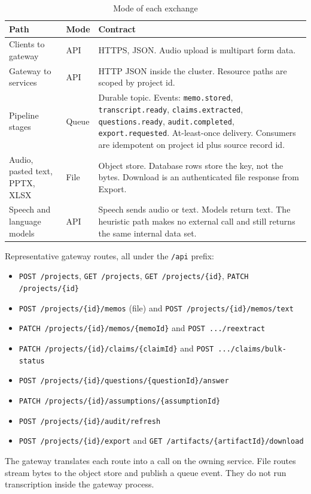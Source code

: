 \documentclass[11pt,a4paper]{article}
\begin{document}
\begin{table}[ht]
\centering
\caption{Mode of each exchange}
\label{tab:modes}
\small
\begin{tabularx}{\textwidth}{@{}l l X@{}}
\toprule
\textbf{Path} & \textbf{Mode} & \textbf{Contract} \\
\midrule
Clients to gateway &
API &
HTTPS, JSON. Audio upload is multipart form data. \\
Gateway to services &
API &
HTTP JSON inside the cluster. Resource paths are scoped by project id. \\
Pipeline stages &
Queue &
Durable topic. Events: \texttt{memo.stored}, \texttt{transcript.ready}, \texttt{claims.extracted}, \texttt{questions.ready}, \texttt{audit.completed}, \texttt{export.requested}. At-least-once delivery. Consumers are idempotent on project id plus source record id. \\
Audio, pasted text, PPTX, XLSX &
File &
Object store. Database rows store the key, not the bytes. Download is an authenticated file response from Export. \\
Speech and language models &
API &
Speech sends audio or text. Models return text. The heuristic path makes no external call and still returns the same internal data set. \\
\bottomrule
\end{tabularx}
\end{table}

Representative gateway routes, all under the \texttt{/api} prefix:

\begin{itemize}
  \item \texttt{POST /projects}, \texttt{GET /projects}, \texttt{GET /projects/\{id\}}, \texttt{PATCH /projects/\{id\}}
  \item \texttt{POST /projects/\{id\}/memos} (file) and \texttt{POST /projects/\{id\}/memos/text}
  \item \texttt{PATCH /projects/\{id\}/memos/\{memoId\}} and \texttt{POST .../reextract}
  \item \texttt{PATCH /projects/\{id\}/claims/\{claimId\}} and \texttt{POST .../claims/bulk-status}
  \item \texttt{POST /projects/\{id\}/questions/\{questionId\}/answer}
  \item \texttt{PATCH /projects/\{id\}/assumptions/\{assumptionId\}}
  \item \texttt{POST /projects/\{id\}/audit/refresh}
  \item \texttt{POST /projects/\{id\}/export} and \texttt{GET /artifacts/\{artifactId\}/download}
\end{itemize}

The gateway translates each route into a call on the owning service. File routes stream bytes to the object store and publish a queue event. They do not run transcription inside the gateway process.
\end{document}
